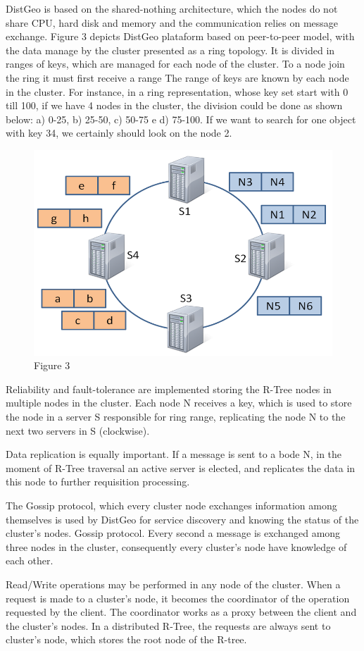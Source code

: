 	DistGeo is based on the shared-nothing architecture, which the nodes do not share CPU, hard disk and memory and the communication relies on message exchange. Figure 3 depicts DistGeo plataform based on peer-to-peer model, with the data manage by the cluster presented as a ring topology. It is divided in ranges of keys, which are managed for each node of the cluster. To a node join the ring it must first receive a range
	The range of keys are known by each node in the cluster. For instance, in a ring representation, whose key set start with 0 till 100, if we have 4 nodes in the cluster, the division could be done as shown below: a) 0-25, b) 25-50, c) 50-75 e d) 75-100. If we want to search for one object with key 34, we certainly should look on the node 2.

\begin{figure}[ht]
\centering
\includegraphics[width=.5\textwidth]{figure3.png}
\caption{Figure 3}
\label{fig: Figure 3}
\end{figure}

	Reliability and fault-tolerance are implemented storing the R-Tree nodes in multiple nodes in the cluster. Each node N receives a key, which is used to store the node in a server S responsible for ring range, replicating the node N to the next two servers in S (clockwise).
	
	Data replication is equally important. If a message is sent to a bode N, in the moment of R-Tree traversal an active server is elected, and replicates the data in this node to further requisition processing.
	
	The Gossip protocol, which every cluster node exchanges information among themselves is used by DistGeo for service discovery and knowing the status of the cluster's nodes. Gossip protocol. Every second a message is exchanged among three nodes in the cluster, consequently every cluster's node have knowledge of each other.
	
	Read/Write operations may be performed in any node of the cluster. When a request is made to a cluster's node, it becomes the coordinator of the operation requested by the client. The coordinator works as a proxy between the client and the cluster's nodes. In a distributed R-Tree, the requests are always sent to cluster's node, which stores the root node of the R-tree.